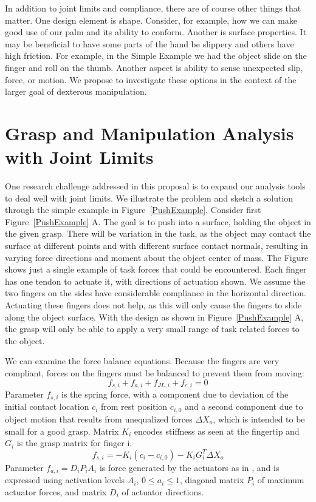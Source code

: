 In addition to joint limits and compliance, there are of course other things that matter.   One design element is shape.   Consider, for example, how we can make good use of our palm and its ability to conform.    Another is surface properties.   It may be beneficial to have some parts of the hand be slippery and others have high friction.   For example, in the Simple Example we had the object slide on the finger and roll on the thumb.   Another aspect is ability to sense unexpected slip, force, or motion.    We propose to investigate these options in the context of the larger goal of dexterous manipulation.


\section{Grasp and Manipulation Analysis with Joint Limits}
   \label{secLimitAnalysis}

One research challenge addressed in this proposal is to expand our analysis tools to deal well with joint limits.   We illustrate the problem and sketch a solution through the simple example in Figure~\ref{PushExample}.   Consider first Figure~\ref{PushExample} A.     The goal is to push into a surface, holding the object in the given grasp.   There will be variation in the task, as the object may contact the surface at different points and with different surface contact normals, resulting in varying force directions and moment about the object center of mass.   The Figure shows just a single example of task forces that could be encountered.    Each finger has one tendon to actuate it, with directions of actuation shown.    We assume the two fingers on the sides have considerable compliance in the horizontal direction.   Actuating these fingers does not help, as this will only cause the fingers to slide along the object surface.    With the design as shown in Figure~\ref{PushExample} A, the grasp will only be able to apply a very small range of task related forces to the object.

We can examine the force balance equations.   Because the fingers are very compliant, forces on the fingers must be balanced to prevent them from moving:
\begin{equation}
    f_{s, i} +     f_{a, i} +     f_{JL, i} +     f_{c, i} = 0
\end{equation}
Parameter $f_{s, i}$ is the spring force, with a component due to deviation of the initial contact location $c_i$ from rest position $c_{i, 0}$ and a second component due to object motion that results from unequalized forces $\Delta X_o$, which is intended to be small for a good grasp.   Matrix $K_i$ encodes stiffness as seen at the fingertip and $G_i$ is the grasp matrix for finger i.
\begin{equation}
 f_{s, i} = -K_i ( c_i - c_{i, 0}) - K_i G^T_i \Delta X_o
\end{equation}
Parameter $f_{a, i} = D_i P_i A_i$ is force generated by the actuators as in \cite{Li:graspDB07}, and is expressed using activation levels $A_i$, $0 \leq a_i \leq 1$, diagonal matrix $P_i$ of maximum actuator forces, and matrix $D_i$ of actuator directions.

